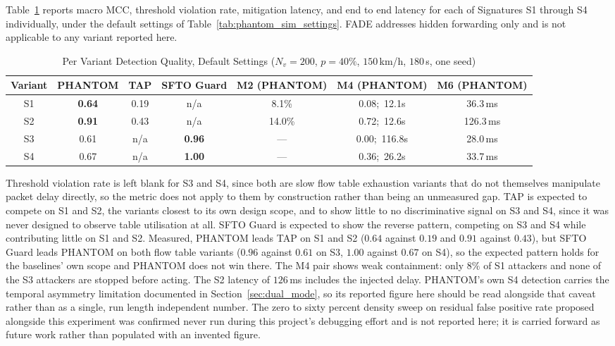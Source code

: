 \documentclass[final,5p,twocolumn]{elsarticle}
\theoremstyle{remark}
\theoremstyle{plain}
\begin{document}
Table~\ref{tab:exp5_variant} reports macro MCC, threshold violation rate,
mitigation latency, and end to end latency for each of Signatures S1 through
S4 individually, under the default settings of
Table~\ref{tab:phantom_sim_settings}. FADE addresses hidden forwarding only
and is not applicable to any variant reported here.
\begin{table}[!t]
	\centering
	\caption{Per Variant Detection Quality, Default Settings ($N_v{=}200$, $p{=}40\%$, $150$\,km/h, $180$\,s, one seed)}
	\label{tab:exp5_variant}
	\renewcommand{\arraystretch}{1.15}
	\footnotesize
	\begin{tabular}{|c|c|c|c|c|c|c|}
		\hline
		\textbf{Variant} & \textbf{PHANTOM} & \textbf{TAP} & \textbf{SFTO Guard} & \textbf{M2 (PHANTOM)} & \textbf{M4 (PHANTOM)} & \textbf{M6 (PHANTOM)} \\
		\hline
		S1 & \textbf{0.64} & 0.19 & n/a & 8.1\% & 0.08;\ 12.1s & 36.3\,ms \\
		\hline
		S2 & \textbf{0.91} & 0.43 & n/a & 14.0\% & 0.72;\ 12.6s & 126.3\,ms \\
		\hline
		S3 & 0.61 & n/a & \textbf{0.96} & --- & 0.00;\ 116.8s & 28.0\,ms \\
		\hline
		S4 & 0.67 & n/a & \textbf{1.00} & --- & 0.36;\ 26.2s & 33.7\,ms \\
		\hline
	\end{tabular}
\end{table}
Threshold violation rate is left blank for S3 and S4, since both are slow
flow table exhaustion variants that do not themselves manipulate packet
delay directly, so the metric does not apply to them by construction rather
than being an unmeasured gap. TAP is expected to compete on S1 and S2, the
variants closest to its own design scope, and to show little to no
discriminative signal on S3 and S4, since it was never designed to observe
table utilisation at all. SFTO Guard is expected to show the reverse
pattern, competing on S3 and S4 while contributing little on S1 and S2.
Measured, PHANTOM leads TAP on S1 and S2 ($0.64$ against $0.19$ and $0.91$ against $0.43$), but SFTO Guard
leads PHANTOM on both flow table variants ($0.96$ against $0.61$ on S3, $1.00$ against $0.67$ on S4), so the
expected pattern holds for the baselines' own scope and PHANTOM does not win there. The M4 pair shows weak
containment: only $8\%$ of S1 attackers and none of the S3 attackers are stopped before acting. The
S2 latency of $126$\,ms includes the injected delay. PHANTOM's own S4 detection carries the temporal asymmetry limitation
documented in Section~\ref{sec:dual_mode}, so its reported figure here
should be read alongside that caveat rather than as a single, run length
independent number. The zero to sixty percent density sweep on residual
false positive rate proposed alongside this experiment was confirmed never
run during this project's debugging effort and is not reported here; it is
carried forward as future work rather than populated with an invented
figure.
\end{document}

